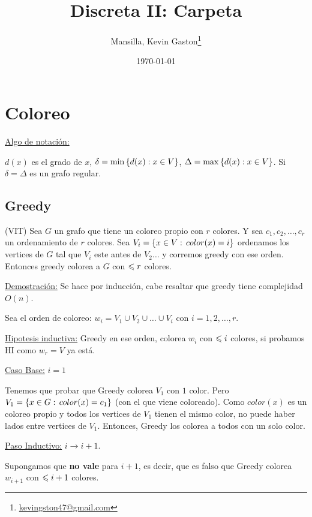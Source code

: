\documentclass[12pt,a4paper]{article}
\author{Mansilla, Kevin Gaston\footnote{\href{mailto:kevingston47@gmail.com}{kevingston47@gmail.com}}}
\title{Discreta II: Carpeta}
\date{\today}
\begin{document}
\maketitle{}

\tableofcontents

\section{Coloreo}
\underline{Algo de notación:}
\medskip

$d(x)$ es el grado de $x$, $\delta = \min \left\lbrace d(x):x\in V \right\rbrace$, $\Delta = \max \left\lbrace d(x):x\in V \right\rbrace$.
Si $\delta = \Delta$ es un grafo regular.

\subsection{Greedy}

\begin{teorema}(VIT) Sea $G$ un grafo que tiene un coloreo propio con $r$ colores. Y 
    sea $c_{1},c_{2},\ldots,c_{r}$ un ordenamiento de $r$ colores. Sea $V_{i} = \left\lbrace x\in V :\, color(x)=i \right\rbrace$
    ordenamos los vertices de $G$ tal que $V_{i}$ este antes de $V_{2}\ldots$ y corremos 
    greedy con ese orden. Entonces greedy colorea a $G$ con $\leqslant r$ colores.
\end{teorema}
\underline{Demostración:} Se hace por inducción, cabe resaltar que greedy tiene 
complejidad $O(n)$.
\medskip

Sea el orden de coloreo: $w_{i} = V_{1} \cup V_{2} \cup \ldots \cup V_{i}$ con  $i=1,2,\ldots,r$.
\medskip

\underline{Hipotesis inductiva:} Greedy en ese orden, colorea $w_{i}$ con $\leqslant i$ colores, si 
probamos HI como $w_{r} = V$ ya está.
\medskip

\underline{Caso Base:} $i=1$
\medskip

Tenemos que probar que Greedy colorea $V_{1}$ con $1$ color. Pero 
$V_{1} = \left\lbrace x \in G : \, color(x) = c_{1} \right\rbrace$ (con el que viene coloreado). 
Como $color(x)$ es un coloreo propio y todos los vertices de $V_{1}$ tienen el 
mismo color, no puede haber lados entre vertices de $V_{1}$. Entonces, Greedy los 
colorea a todos con un solo color.
\medskip

\underline{Paso Inductivo:} $i \rightarrow i+1$.
\medskip

Supongamos que \textbf{no vale} para $i+1$, es decir, que es falso que Greedy colorea $w_{i+1}$ 
con $\leqslant i+1$ colores.
\medskip
\end{document}
